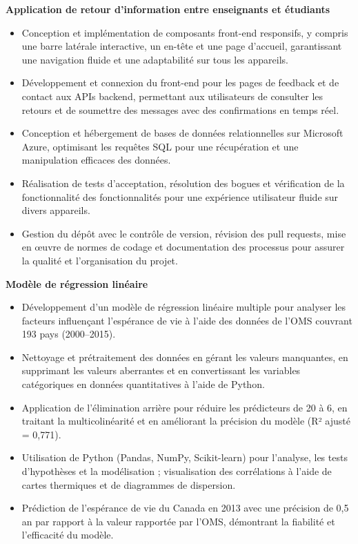 \documentclass[10pt]{article}
\begin{document}
\textbf{Application de retour d'information entre enseignants et étudiants} 
\vspace{-4mm}
\begin{itemize}[left=0.15in, itemsep=0pt, label=--]
    \item Conception et implémentation de composants front-end responsifs, y compris une barre latérale interactive, un en-tête et une page d'accueil, garantissant une navigation fluide et une adaptabilité sur tous les appareils.
    \item Développement et connexion du front-end pour les pages de feedback et de contact aux APIs backend, permettant aux utilisateurs de consulter les retours et de soumettre des messages avec des confirmations en temps réel.
    \item Conception et hébergement de bases de données relationnelles sur Microsoft Azure, optimisant les requêtes SQL pour une récupération et une manipulation efficaces des données.
    \item Réalisation de tests d'acceptation, résolution des bogues et vérification de la fonctionnalité des fonctionnalités pour une expérience utilisateur fluide sur divers appareils.
    \item Gestion du dépôt avec le contrôle de version, révision des pull requests, mise en œuvre de normes de codage et documentation des processus pour assurer la qualité et l'organisation du projet.
\end{itemize}

\textbf{Modèle de régression linéaire} 
\vspace{-4mm}
\begin{itemize}[left=0.15in, itemsep=0pt, label=--]
    \item Développement d'un modèle de régression linéaire multiple pour analyser les facteurs influençant l'espérance de vie à l'aide des données de l'OMS couvrant 193 pays (2000–2015).
    \item Nettoyage et prétraitement des données en gérant les valeurs manquantes, en supprimant les valeurs aberrantes et en convertissant les variables catégoriques en données quantitatives à l'aide de Python.
    \item Application de l'élimination arrière pour réduire les prédicteurs de 20 à 6, en traitant la multicolinéarité et en améliorant la précision du modèle (R² ajusté = 0,771).
    \item Utilisation de Python (Pandas, NumPy, Scikit-learn) pour l'analyse, les tests d'hypothèses et la modélisation ; visualisation des corrélations à l'aide de cartes thermiques et de diagrammes de dispersion.
    \item Prédiction de l'espérance de vie du Canada en 2013 avec une précision de 0,5 an par rapport à la valeur rapportée par l'OMS, démontrant la fiabilité et l'efficacité du modèle.
\end{itemize}
\end{document}
